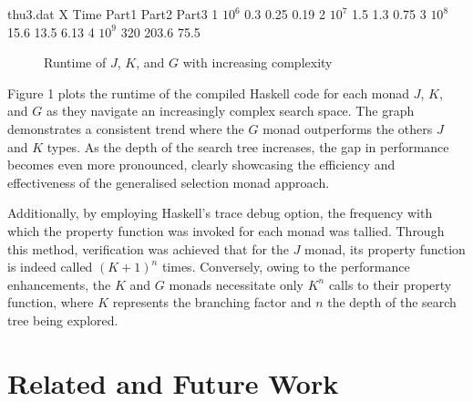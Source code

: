 \documentclass[runningheads]{llncs}
\begin{document}
\begin{filecontents}{thu3.dat}
X Time      Part1  Part2   Part3
1 $10^6$    0.3    0.25    0.19
2 $10^7$    1.5    1.3     0.75
3 $10^8$    15.6   13.5    6.13
4 $10^9$    320    203.6   75.5
\end{filecontents}
\begin{figure}[H]
\begin{center}
\end{center}
\caption{Runtime of $J$, $K$, and $G$ with increasing complexity}
\end{figure}

Figure 1 plots the runtime of the compiled Haskell code for each monad
\(J\), \(K\), and \(G\) as they navigate an increasingly complex search
space. The graph demonstrates a consistent trend where the \(G\) monad
outperforms the others \(J\) and \(K\) types. As the depth of the search
tree increases, the gap in performance becomes even more pronounced,
clearly showcasing the efficiency and effectiveness of the generalised
selection monad approach.

\qquad Additionally, by employing Haskell's trace debug option, the
frequency with which the property function was invoked for each monad
was tallied. Through this method, verification was achieved that for the
\(J\) monad, its property function is indeed called \((K + 1)^n\) times.
Conversely, owing to the performance enhancements, the \(K\) and \(G\)
monads necessitate only \(K^n\) calls to their property function, where
\(K\) represents the branching factor and \(n\) the depth of the search
tree being explored.

\section{Related and Future Work}\label{related-and-future-work}
\end{document}
